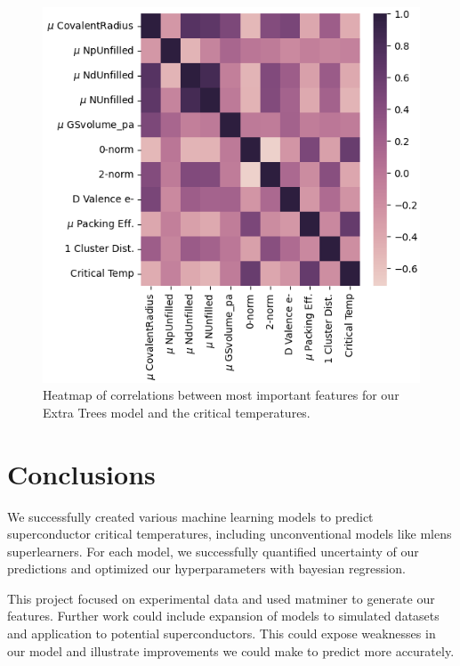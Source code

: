 \documentclass[twocolumn, nofootinbib, secnumarabic, amssymb, nobibnotes, aps, prd]{revtex4-2}
\begin{document}
\begin{figure}[!h]
   \centering
   \includegraphics[width=\columnwidth]{images/feature_heatmap_eti.png}
   \caption{Heatmap of correlations between most important features for our Extra Trees model and the critical temperatures.}
   \label{fig:feature-correlations}
\end{figure}%

\section{Conclusions} %
We successfully created various machine learning models to predict superconductor critical temperatures, including unconventional models like mlens superlearners. For each model, we successfully quantified uncertainty of our predictions and optimized our hyperparameters with bayesian regression. 

This project focused on experimental data and used matminer to generate our features. Further work could include expansion of models to simulated datasets and application to potential superconductors. This could expose weaknesses in our model and illustrate improvements we could make to predict more accurately.
\end{document}
